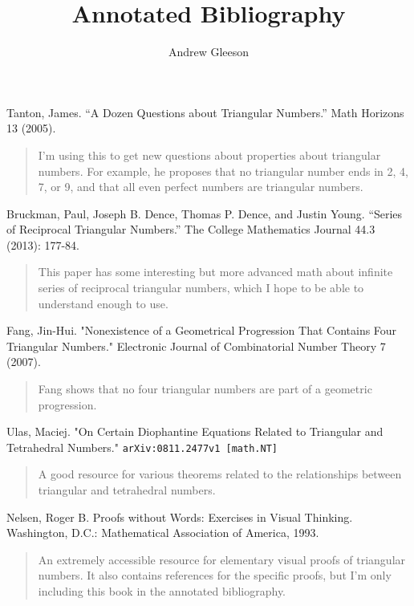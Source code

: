 \documentclass{article}
\begin{document}
\title{Annotated Bibliography}
\author{Andrew Gleeson}

\maketitle



 Tanton, James. ``A Dozen Questions about Triangular Numbers.'' Math Horizons 13 (2005).
\begin{quote}
I'm using this to get new questions about properties about triangular numbers. For example, he proposes that no triangular number ends in 2, 4, 7, or 9, and that all even perfect numbers are triangular numbers.
\end{quote}
\vspace{5 mm}

 Bruckman, Paul, Joseph B. Dence, Thomas P. Dence, and Justin Young. ``Series of Reciprocal Triangular Numbers.'' The College Mathematics Journal 44.3 (2013): 177-84. \\
\begin{quote}
This paper has some interesting but more advanced math about infinite series of reciprocal triangular numbers, which I hope to be able to understand enough to use.
\end{quote}\vspace{5 mm}

 Fang, Jin-Hui. "Nonexistence of a Geometrical Progression That Contains Four Triangular Numbers." Electronic Journal of Combinatorial Number Theory 7 (2007).
\begin{quote}
Fang shows that no four triangular numbers are part of a geometric progression.
\end{quote}\vspace{5 mm}

 Ulas, Maciej. "On Certain Diophantine Equations Related to Triangular and Tetrahedral Numbers." {\tt arXiv:0811.2477v1 [math.NT]}
\begin{quote}
A good resource for various theorems related to the relationships between triangular and tetrahedral numbers.
\end{quote}\vspace{5 mm}

\newpage

 Nelsen, Roger B. Proofs without Words: Exercises in Visual Thinking. Washington, D.C.: Mathematical Association of America, 1993.
\begin{quote}
An extremely accessible resource for elementary visual proofs of triangular numbers. It also contains references for the specific proofs, but I'm only including this book in the annotated bibliography.
\end{quote}\vspace{5 mm}
\end{document}
